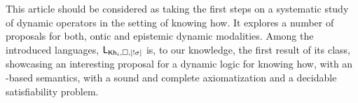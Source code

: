 \begin{mrevised}
\begin{comment}
Another aspect unexploited by the ontic proposals, is the dimension involving plan indistinguishability, the most distinctive feature of our semantics. In this regard, we proposed modalities that remove indistinguishability between plans, reducing the uncertainty of an agent. Similar to what happened to very general dynamic modalities (see e.g.~\cite{ArecesFH15}), axiomatizing these operators turns to be challenging. We showed that for instance in our proposals, uniforme substitution does not hold. To overcome this issue, we propose a new logic featuring two novel operations: a basic modality $[a]$, and a novel dynamic modality that distinguishes the effect of a plan from the rest. The latter emerges as an alternative of more expressive operators, but in which the information about a single plan is revealed, instead of information about two plans being different. For the former, the benefits are twofold. First, it enables us to explicitly talk about the execution of actions. Second, as a by product it provides us the expressivity to obtain an axiomatization via reduction axioms.
\end{comment}

\begin{comment}
To the best of our knowledge, this is the first attempt to establish a theory of dynamic epistemic logics for knowing how. We argue that the semantics provided in~\cite{AFSVQ21,AFSVQ23report} is the crucial aspect for succeeding in this goal. Moreover, our work opens the path to study other dynamic operators in this context. For instance, we could define dynamic modalities based on action models, like those in~\cite{BaltagMS98,DELbook,GalimullinA22}. 
Also, it would be interesting to explore alternative techniques for obtaining proof systems without a general rule of substitution, for instance, by building a dynamic logic over a hybrid logic semantics (see e.g.~\cite{BenthemMZ2022}). Finally, we would like to characterize the exact complexity of the dynamic logics we introduced.
\end{comment}


This article should be considered as taking the first steps on a systematic study of dynamic operators in the setting of knowing how.  It explores a number of proposals for both, ontic and epistemic dynamic modalities. 
Among the introduced languages, $\mathsf{L}_{{\sf Kh}_i,\square,[!\sigma]}$ is,  to our knowledge, the first result of its class, showcasing an interesting proposal for a dynamic logic for knowing how, with an \ults-based semantics, with a sound and complete axiomatization and a decidable satisfiability problem. 


\end{mrevised}

